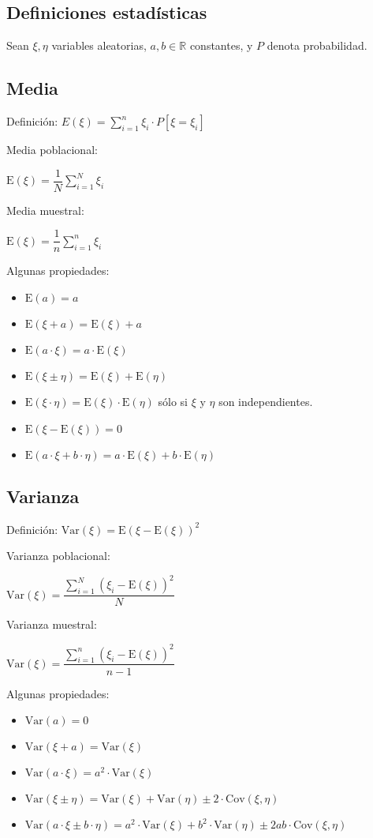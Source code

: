 \documentclass[10pt, a4paper, landscape]{extarticle}
\newcommand{\E}{\mathrm{E}}
\newcommand{\Var}{\mathrm{Var}}
\newcommand{\Cov}{\mathrm{Cov}}
\begin{document}
\begin{multicols}{3}
\section*{Definiciones estadísticas}
	Sean $\xi, \eta$ variables aleatorias, $a, b \in \mathbb{R}$ constantes, y $P$ denota probabilidad.
	\subsection*{Media}
		Definición: \quad $E(\xi) = \sum_{i=1}^{n} \xi_i \cdot P[\xi = \xi_i]$
		\begin{multicols}{2}
			Media poblacional:
			\begin{center}
				$\E(\xi) = \dfrac{1}{N} \sum_{i=1}^{N} \xi_i$
			\end{center}
			\columnbreak
			Media muestral:
			\begin{center}
				$\E(\xi) = \dfrac{1}{n} \sum_{i=1}^{n} \xi_i$
			\end{center}
		\end{multicols}
		Algunas propiedades:
		\begin{itemize}[leftmargin=*]
			\item $\E(a) = a$
			\item $\E(\xi + a) = \E(\xi) + a$
			\item $\E(a \cdot \xi) = a \cdot \E(\xi)$
			\item $\E(\xi \pm \eta) = \E(\xi) + \E(\eta)$
			\item $\E(\xi \cdot \eta) = \E(\xi) \cdot \E(\eta)$ \quad sólo si $\xi$ y $\eta$ son independientes.
			\item $\E(\xi - \E(\xi)) = 0$
			\item $\E(a \cdot \xi + b \cdot \eta) = a \cdot \E(\xi) + b \cdot \E(\eta)$
		\end{itemize}
	\subsection*{Varianza}
		Definición: \quad $\Var(\xi) = \E(\xi - \E(\xi))^2$
		\begin{multicols}{2}
			Varianza poblacional:
			\begin{center}
				$\Var(\xi) = \dfrac{\sum_{i=1}^{N} (\xi_i - \E(\xi))^2}{N}$
			\end{center}
			\columnbreak
			Varianza muestral:
			\begin{center}
				$\Var(\xi) = \dfrac{\sum_{i=1}^{n} (\xi_i - \E(\xi))^2}{n-1}$
			\end{center}
		\end{multicols}
		Algunas propiedades:
		\begin{itemize}[leftmargin=*]
			\item $\Var(a) = 0$
			\item $\Var(\xi + a) = \Var(\xi)$
			\item $\Var(a \cdot \xi) = a^2 \cdot \Var(\xi)$
			\item $\Var(\xi \pm \eta) = \Var(\xi) + \Var(\eta) \pm 2 \cdot \Cov(\xi, \eta)$
			\item $\Var(a \cdot \xi \pm b \cdot \eta) = a^2 \cdot \Var(\xi) + b^2 \cdot \Var(\eta) \pm 2 a b \cdot \Cov(\xi, \eta)$
		\end{itemize}

\end{multicols}
\end{document}
